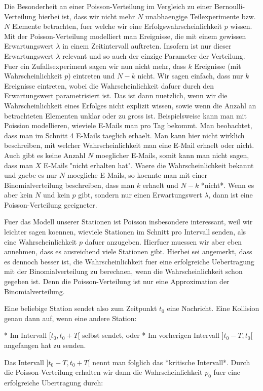 Die Besonderheit an einer Poisson-Verteilung im Vergleich zu einer
Bernoulli-Verteilung hierbei ist, dass wir nicht mehr $N$ unabhaengige
Teilexperimente bzw. $N$ Elemente betrachten, fuer welche wir eine
Erfolgswahrscheinlichkeit $p$ wissen. Mit der Poisson-Verteilung modelliert man
Ereignisse, die mit einem gewissen Erwartungswert $\lambda$ in einem
Zeitintervall auftreten. Insofern ist nur dieser Erwartungswert $\lambda$
relevant und so auch der einzige Parameter der Verteilung. Fuer ein
Zufallsexperiment sagen wir nun nicht mehr, dass $k$ Ereignisse (mit
Wahrscheinlichkeit $p$) eintreten und $N - k$ nicht. Wir sagen einfach, dass nur
$k$ Ereignisse eintreten, wobei die Wahrscheinlichkeit dafuer durch den
Erwartungswert parametrisiert ist. Das ist dann nuetzlich, wenn wir die
Wahrscheinlichkeit eines Erfolges nicht explizit wissen, sowie wenn die Anzahl
an betrachteten Elementen unklar oder zu gross ist. Beispielsweise kann man mit
Poission modellieren, wieviele E-Mails man pro Tag bekommt. Man beobachtet, dass
man im Schnitt 4 E-Mails taeglich erhaelt. Man kann hier nicht wirklich
beschreiben, mit welcher Wahrscheinlichkeit man eine E-Mail erhaelt oder
nicht. Auch gibt es keine Anzahl $N$ moeglicher E-Mails, somit kann man nicht
sagen, dass man $X$ E-Mails "nicht erhalten hat". Waere die Wahrscheinlichkeit
bekannt und gaebe es nur $N$ moegliche E-Mails, so koennte man mit einer
Binomialverteilung beschreiben, dass man $k$ erhaelt und $N - k$ *nicht*. Wenn
es aber kein $N$ und kein $p$ gibt, sondern nur einen Erwartungswert $\lambda$,
dann ist eine Poisson-Verteilung geeigneter.

Fuer das Modell unserer Stationen ist Poisson insbesondere interessant, weil wir
leichter sagen koennen, wieviele Stationen im Schnitt pro Intervall senden, als
eine Wahrscheinlichkeit $p$ dafuer anzugeben. Hierfuer muessen wir aber eben
annehmen, dass es ausreichend viele Stationen gibt. Hierbei sei angemerkt, dass
es dennoch besser ist, die Wahrscheinlichkeit fuer eine erfolgreiche
Uebertragung mit der Binomialverteilung zu berechnen, wenn die
Wahrscheinlichkeit schon gegeben ist. Denn die Poisson-Verteilung ist nur eine
Approximation der Binomialverteilung.

Eine beliebige Station sendet also zum Zeitpunkt $t_0$ eine Nachricht. Eine
Kollision genau dann auf, wenn eine andere Station:

* Im Intervall $[t_0, t_0 + T[$ selbst sendet, oder
* Im vorherigen Intervall $]t_0 - T, t_0[$ angefangen hat zu senden.

Das Intervall $]t_0 - T, t_0 + T[$ nennt man folglich das *kritische Intervall*. Durch die Poisson-Verteilung erhalten wir dann die Wahrscheinlichkeit $p_0$ fuer eine erfolgreiche Ubertragung durch:


